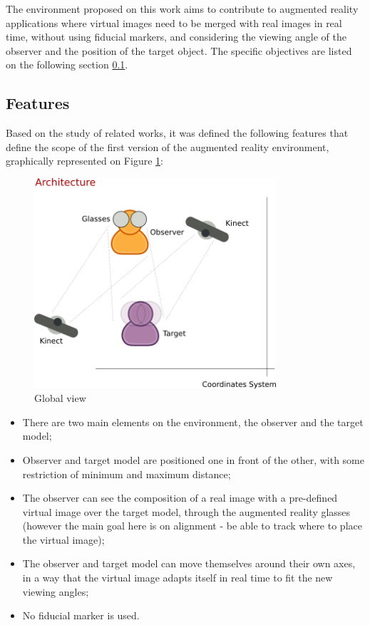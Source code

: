 \documentclass[msc, a4paper, classic, en]{ufbathesis}
\begin{document}
The environment proposed on this work aims to contribute to augmented reality applications where virtual images need to be merged with real images in real time, without using fiducial markers, and considering the viewing angle of the observer and the position of the target object. The specific objectives are listed on the following section \ref{sec:features}.

\subsection{Features}
\label{sec:features}

Based on the study of related works, it was defined the following features that define the scope of the first version of the augmented
reality environment, graphically represented on Figure \ref{fig:diagram}:

\begin{figure}
\centering
\includegraphics[width=0.8\textwidth]{images/diagram.png}
\caption{Global view}
\label{fig:diagram}
\end{figure}

\begin{itemize}
  \item There are two main elements on the environment, the observer and the target model;
  \item Observer and target model are positioned one in front of the other, with some restriction of minimum and maximum distance;
  \item The observer can see the composition of a real image with a pre-defined virtual image over the target model, through the augmented
        reality glasses (however the main goal here is on alignment - be able to track where to place the virtual image);
  \item The observer and target model can move themselves around their own axes, in a way that the virtual image adapts itself in real time to fit the new
        viewing angles;
  \item No fiducial marker is used.
\end{itemize}
\end{document}
